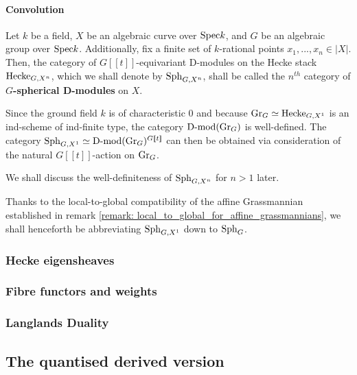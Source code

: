                 \paragraph{Convolution}
                    \begin{definition} \label{def: spherical_D_modules}
                        Let $k$ be a field, $X$ be an algebraic curve over $\mathrm{Spec} k$, and $G$ be an algebraic group over $\mathrm{Spec} k$. Additionally, fix a finite set of $k$-rational points $x_1, ..., x_n \in |X|$. Then, the category of $G[\![t]\!]$-equivariant D-modules on the Hecke stack $\mathrm{Hecke}_{G, X^n}$, which we shall denote by $\mathrm{Sph}_{G, X^n}$, shall be called the $n^{th}$ category of \textbf{$G$-spherical D-modules} on $X$.
                    \end{definition}
                    \begin{remark}
                        Since the ground field $k$ is of characteristic $0$ and because $\mathrm{Gr}_G \simeq \mathrm{Hecke}_{G, X^1}$ is an ind-scheme of ind-finite type, the category $\mathrm{D}\text{-}\mathrm{mod}(\mathrm{Gr}_G)$ is well-defined. The category $\mathrm{Sph}_{G, X^1} \simeq \mathrm{D}\text{-}\mathrm{mod}(\mathrm{Gr}_G)^{G[\![t]\!]}$ can then be obtained via consideration of the natural $G[\![t]\!]$-action on $\mathrm{Gr}_G$. 
                                
                        We shall discuss the well-definiteness of $\mathrm{Sph}_{G, X^n}$ for $n > 1$ later.
                    \end{remark}
                    \begin{convention}
                        Thanks to the local-to-global compatibility of the affine Grassmannian established in remark \ref{remark: local_to_global_for_affine_grassmannians}, we shall henceforth be abbreviating $\mathrm{Sph}_{G, X^1}$ down to $\mathrm{Sph}_G$.
                    \end{convention}
            
            \subsubsection{Hecke eigensheaves}
            
            \subsubsection{Fibre functors and weights}
            
            \subsubsection{Langlands Duality}
            
        \subsection{The quantised derived version}